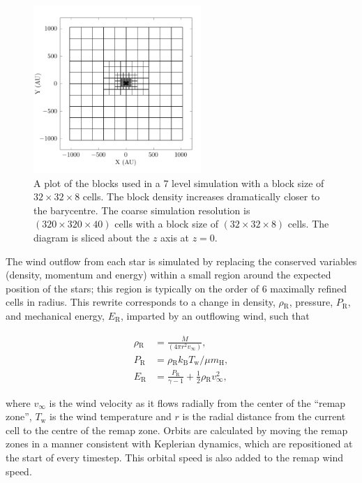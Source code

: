 \documentclass[fleqn,usenatbib]{mnras}
\newcommand{\rms}[1]{\ensuremath{_{\text{#1}}}}
\begin{document}
\begin{figure}
  \centering
  \includegraphics[width=2.5in]{assets/mesh/gridxy.pdf}
  \caption[Static mesh refinement example]{A plot of the blocks used in a 7 level simulation with a block size of $32\times 32 \times 8$ cells. The block density increases dramatically closer to the barycentre. The coarse simulation resolution is $(320\times 320\times 40)$ cells with a block size of $(32\times32\times8)$ cells. The diagram is sliced about the $z$ axis at $z=0$.}
  \label{fig:smr-grid}
\end{figure}

The wind outflow from each star is simulated by replacing the conserved variables (density, momentum and energy) within a small region around the expected position of the stars; this region is typically on the order of 6 maximally refined cells in radius.
This rewrite corresponds to a change in density, $\rho \rms R$, pressure, $P \rms R$, and mechanical energy, $E \rms R$, imparted by an outflowing wind, such that

\begin{subequations}
  \begin{align}
    \rho \rms R & = \frac{\dot M}{(4 \pi r^2 v_\infty)} , \\
    P \rms R    & = \rho \rms R k \rms B T \rms w / \mu m \rms H , \\
    E\rms R   &  = \frac{P \rms R}{\gamma - 1} + \frac{1}{2} \rho \rms R v_\infty^2 ,
  \end{align}
\end{subequations}

\noindent
where $v_\infty$ is the wind velocity as it flows radially from the center of the ``remap zone'', $T \rms w$ is the wind temperature and $r$ is the radial distance from the current cell to the centre of the remap zone.
Orbits are calculated by moving the remap zones in a manner consistent with Keplerian dynamics, which are repositioned at the start of every timestep.
This orbital speed is also added to the remap wind speed.
\end{document}
